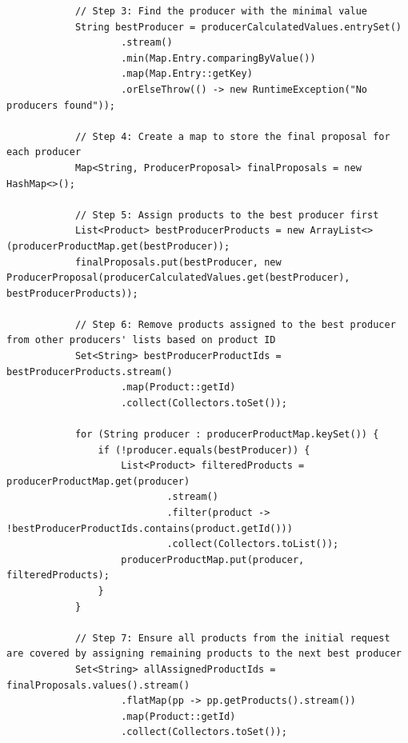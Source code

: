 \begin{lstlisting}
            // Step 3: Find the producer with the minimal value
            String bestProducer = producerCalculatedValues.entrySet()
                    .stream()
                    .min(Map.Entry.comparingByValue())
                    .map(Map.Entry::getKey)
                    .orElseThrow(() -> new RuntimeException("No producers found"));
    
            // Step 4: Create a map to store the final proposal for each producer
            Map<String, ProducerProposal> finalProposals = new HashMap<>();
    
            // Step 5: Assign products to the best producer first
            List<Product> bestProducerProducts = new ArrayList<>(producerProductMap.get(bestProducer));
            finalProposals.put(bestProducer, new ProducerProposal(producerCalculatedValues.get(bestProducer), bestProducerProducts));
    
            // Step 6: Remove products assigned to the best producer from other producers' lists based on product ID
            Set<String> bestProducerProductIds = bestProducerProducts.stream()
                    .map(Product::getId)
                    .collect(Collectors.toSet());
    
            for (String producer : producerProductMap.keySet()) {
                if (!producer.equals(bestProducer)) {
                    List<Product> filteredProducts = producerProductMap.get(producer)
                            .stream()
                            .filter(product -> !bestProducerProductIds.contains(product.getId()))
                            .collect(Collectors.toList());
                    producerProductMap.put(producer, filteredProducts);
                }
            }
    
            // Step 7: Ensure all products from the initial request are covered by assigning remaining products to the next best producer
            Set<String> allAssignedProductIds = finalProposals.values().stream()
                    .flatMap(pp -> pp.getProducts().stream())
                    .map(Product::getId)
                    .collect(Collectors.toSet());
    

\end{lstlisting}
